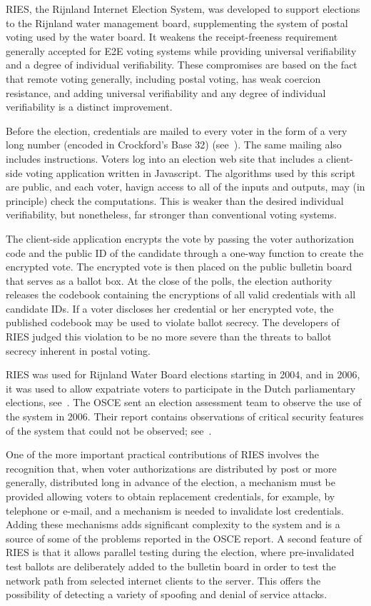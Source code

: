 RIES, the Rijnland Internet Election System, was developed to support
elections to the Rijnland water management board, supplementing the system
of postal voting used by the water board.  It weakens the receipt-freeness
requirement generally accepted for E2E voting systems while providing
universal verifiability and a degree of individual verifiability.  These
compromises are based on the fact that remote voting generally, including
postal voting, has weak coercion resistance, and adding universal
verifiability and any degree of individual verifiability is a distinct
improvement.

Before the election, credentials are mailed to every voter in the form of a
very long number (encoded in Crockford's Base 32)
(see~\cite{crockford2002}).  The same mailing also includes instructions.
Voters log into an election web site that includes a client-side voting
application written in Javascript.  The algorithms used by this script are
public, and each voter, havign access to all of the inputs and outputs, may
(in principle) check the computations.  This is weaker than the desired
individual verifiability, but nonetheless, far stronger than conventional
voting systems.

The client-side application encrypts the vote by passing the voter
authorization code and the public ID of the candidate through a one-way
function to create the encrypted vote.  The encrypted vote is then placed on
the public bulletin board that serves as a ballot box.  At the close of the
polls, the election authority releases the codebook containing the
encryptions of all valid credentials with all candidate IDs. If a voter
discloses her credential or her encrypted vote, the published codebook may
be used to violate ballot secrecy. The developers of RIES judged this
violation to be no more severe than the threats to ballot secrecy inherent
in postal voting.

RIES was used for Rijnland Water Board elections starting in 2004, and in
2006, it was used to allow expatriate voters to participate in the Dutch
parliamentary elections, see~\cite{gonggrijp2009}. The OSCE sent an election
assessment team to observe the use of the system in 2006.  Their report
contains observations of critical security features of the system that could
not be observed; see~\cite{osce2007}.

One of the more important practical contributions of RIES involves the
recognition that, when voter authorizations are distributed by post or more
generally, distributed long in advance of the election, a mechanism must be
provided allowing voters to obtain replacement credentials, for example, by
telephone or e-mail, and a mechanism is needed to invalidate lost
credentials.  Adding these mechanisms adds significant complexity to the
system and is a source of some of the problems reported in the OSCE report.
A second feature of RIES is that it allows parallel testing during the
election, where pre-invalidated test ballots are deliberately added to the
bulletin board in order to test the network path from selected internet
clients to the server.  This offers the possibility of detecting a variety
of spoofing and denial of service attacks.


